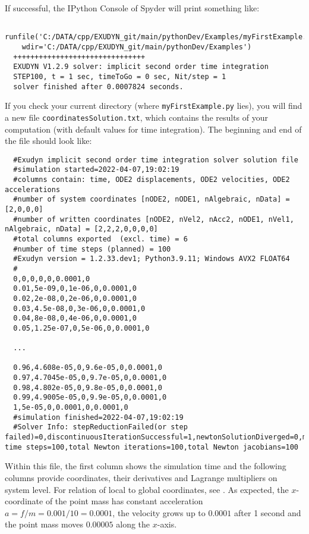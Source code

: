 If successful, the IPython Console of Spyder will print something like:
\begin{lstlisting}
  runfile('C:/DATA/cpp/EXUDYN_git/main/pythonDev/Examples/myFirstExample.py', 
    wdir='C:/DATA/cpp/EXUDYN_git/main/pythonDev/Examples')
  +++++++++++++++++++++++++++++++
  EXUDYN V1.2.9 solver: implicit second order time integration
  STEP100, t = 1 sec, timeToGo = 0 sec, Nit/step = 1
  solver finished after 0.0007824 seconds.
\end{lstlisting}

If you check your current directory (where \texttt{myFirstExample.py} lies), you will find a new file \texttt{coordinatesSolution.txt}, which contains the results of your computation (with default values for time integration).
The beginning and end of the file should look like: \vspace{6pt}\\
\begin{lstlisting}
  #Exudyn implicit second order time integration solver solution file
  #simulation started=2022-04-07,19:02:19
  #columns contain: time, ODE2 displacements, ODE2 velocities, ODE2 accelerations
  #number of system coordinates [nODE2, nODE1, nAlgebraic, nData] = [2,0,0,0]
  #number of written coordinates [nODE2, nVel2, nAcc2, nODE1, nVel1, nAlgebraic, nData] = [2,2,2,0,0,0,0]
  #total columns exported  (excl. time) = 6
  #number of time steps (planned) = 100
  #Exudyn version = 1.2.33.dev1; Python3.9.11; Windows AVX2 FLOAT64
  #
  0,0,0,0,0,0.0001,0
  0.01,5e-09,0,1e-06,0,0.0001,0
  0.02,2e-08,0,2e-06,0,0.0001,0
  0.03,4.5e-08,0,3e-06,0,0.0001,0
  0.04,8e-08,0,4e-06,0,0.0001,0
  0.05,1.25e-07,0,5e-06,0,0.0001,0

  ...

  0.96,4.608e-05,0,9.6e-05,0,0.0001,0
  0.97,4.7045e-05,0,9.7e-05,0,0.0001,0
  0.98,4.802e-05,0,9.8e-05,0,0.0001,0
  0.99,4.9005e-05,0,9.9e-05,0,0.0001,0
  1,5e-05,0,0.0001,0,0.0001,0
  #simulation finished=2022-04-07,19:02:19
  #Solver Info: stepReductionFailed(or step failed)=0,discontinuousIterationSuccessful=1,newtonSolutionDiverged=0,massMatrixNotInvertible=1,total time steps=100,total Newton iterations=100,total Newton jacobians=100
\end{lstlisting}
%
Within this file, the first column shows the simulation time and the following columns provide coordinates, their derivatives and Lagrange multipliers on system level. For relation of local to global coordinates, see . As expected, the $x$-coordinate of the point mass has constant acceleration $a=f/m=0.001/10=0.0001$, the velocity grows up to $0.0001$ after 1 second and the point mass moves $0.00005$ along the $x$-axis.

